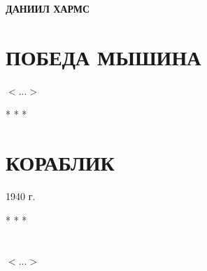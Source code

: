 \documentclass{article}
\begin{document}
	\begin{center}
		\textbf{\LARGE ДАНИИЛ ХАРМС}
	\end{center}
	
	\section*{\large ПОБЕДА МЫШИНА}
	
	
	\begin{flushright}
		$<...>$
	\end{flushright}
	\begin{center}
		* * *
	\end{center}
	
	\section*{\large КОРАБЛИК}
	
	
	\begin{flushright}
		1940 г.
	\end{flushright}
	\begin{center}
		* * *
	\end{center}
	
	\section*{}
	
	\begin{flushright}
		$<...>$
	\end{flushright}
	
	
\end{document}
